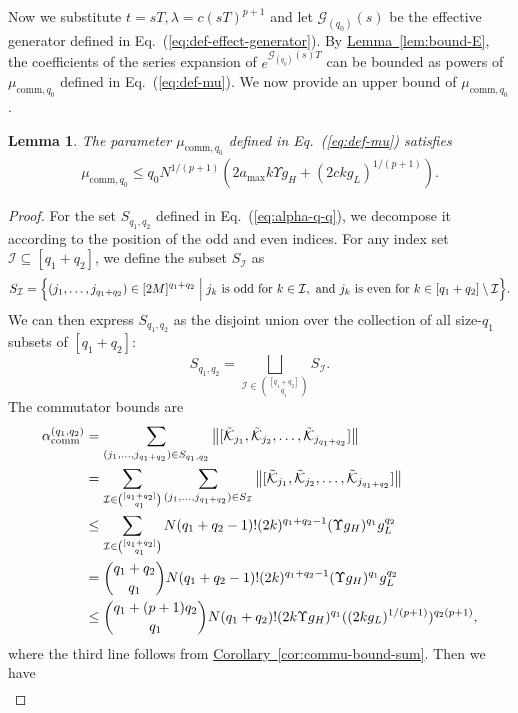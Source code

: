 \documentclass[aps,pra,reprint,groupedaddress,floatfix]{revtex4-2}
\newtheorem{lemma}{Lemma}
\newcommand{\eq}[1]{(\ref{eq:#1})}
\newcommand{\cor}[1]{\hyperref[cor:#1]{Corollary~\ref*{cor:#1}}}
\newcommand{\lem}[1]{\hyperref[lem:#1]{Lemma~\ref*{lem:#1}}}
\newcommand{\G}{\mathcal{G}}
\newcommand{\mc}{\mathcal}
\begin{document}
Now we substitute $t = sT, \lambda = c (sT)^{p+1}$ and let $\G_{(q_0)}(s)$ be the effective generator defined in Eq.~\eq{def-effect-generator}. By \lem{bound-E}, the coefficients of the series expansion of $e^{\G_{(q_0)}(s)T}$ can be bounded as powers of $\mu_{\mathrm{comm},q_0}$ defined in Eq.~\eq{def-mu}. We now provide an upper bound of $\mu_{\mathrm{comm},q_0}$. 
\begin{lemma}
\label{lem:bound-mu}
    The parameter $\mu_{\mathrm{comm},q_0}$ defined in Eq.~\eq{def-mu} satisfies \begin{align*}
        \mu_{\mathrm{comm},q_0} \le q_0 N^{1/(p+1)}(2a_{\max}k \Upsilon g_H+ (2ckg_L)^{1/(p+1)}).
    \end{align*}
\end{lemma}
\begin{proof}
    For the set $S_{q_1, q_2}$ defined in Eq.~\eq{alpha-q-q}, we decompose it according to the position of the odd and even indices.  For any index set $\mathcal{I} \subseteq [q_1+q_2]$, we define the subset $S_{\mathcal{I}}$ as
    \[
    S_{\mathcal{I}} = \Bigl\{ (j_1, \ldots, j_{q_1+q_2}) \in [2M]^{q_1+q_2} \Bigm| 
        j_k \text{ is odd for } k \in \mathcal{I}, \text{ and } 
        j_k \text{ is even for } k \in [q_1+q_2] \setminus \mathcal{I}
    \Bigr\}.
    \]
    We can then express $S_{q_1, q_2}$ as the disjoint union over the collection of all size-$q_1$ subsets of $[q_1+q_2]$:
    \[
    S_{q_1, q_2} = \bigsqcup_{\mathcal{I} \in \binom{[q_1+q_2]}{q_1}} S_{\mathcal{I}}.
    \]
    The commutator bounds are \begin{align*}
    \alpha_{\rm comm}^{(q_1,q_2)} &=  \sum_{(j_1, \ldots, j_{q_1+q_2})\in S_{q_1, q_2}}\big\|[\tilde{\mc K}_{j_1}, \tilde{\mc K}_{j_2},\ldots,\tilde{\mc K}_{j_{q_1+q_2}}]\big\|\\
    &= \sum_{\mc I\in \binom{[q_1+q_2]}{q_1}}\sum_{(j_1, \ldots, j_{q_1+q_2})\in S_{\mc I}}\big\|[\tilde{\mc K}_{j_1}, \tilde{\mc K}_{j_2},\ldots,\tilde{\mc K}_{j_{q_1+q_2}}]\big\|\\
    &\le \sum_{\mc I\in \binom{[q_1+q_2]}{q_1}} N(q_1+q_2-1)!(2k)^{q_1+q_2-1}(\Upsilon g_H)^{q_1}g_L^{q_2}\\
    &= \binom{q_1+q_2}{q_1}N(q_1+q_2-1)!(2k)^{q_1+q_2-1}(\Upsilon g_H)^{q_1}g_L^{q_2}\\
    &\le \binom{q_1+(p+1)q_2}{q_1}N(q_1+q_2)!(2k\Upsilon g_H)^{q_1}((2kg_L)^{1/(p+1)})^{q_2(p+1)},
    \end{align*}
    where the third line follows from \cor{commu-bound-sum}. Then we have  \begin{align*}

\end{align*}
\end{proof}
\end{document}
